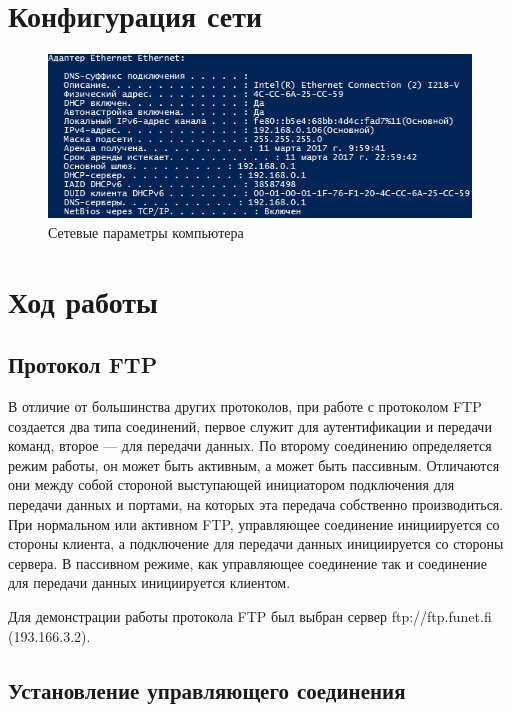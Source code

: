 \documentclass[14pt,a4paper,report]{report}
\begin{document}
\section{Конфигурация сети}

\begin{figure}[h!]
	\centering
	\includegraphics[scale = 1.1]{images/config.png}
	
	\caption{Сетевые параметры компьютера}
	\label{image:1}
\end{figure}

\section{Ход работы}

\subsection{Протокол FTP}

В отличие от большинства других протоколов, при работе с протоколом FTP создается два типа соединений, первое  служит для аутентификации и передачи команд, второе — для передачи данных. По второму соединению определяется режим работы, он может быть активным, а может быть пассивным. Отличаются они между собой стороной выступающей инициатором подключения для передачи данных и портами, на которых эта передача собственно производиться. При нормальном или активном FTP, управляющее соединение инициируется со стороны клиента, а подключение для передачи данных инициируется со стороны сервера. В пассивном режиме, как управляющее соединение так и соединение для передачи данных инициируется клиентом.

Для демонстрации работы протокола FTP был выбран сервер ftp://ftp.funet.fi (193.166.3.2).

\subsection{Установление управляющего соединения}
\end{document}
